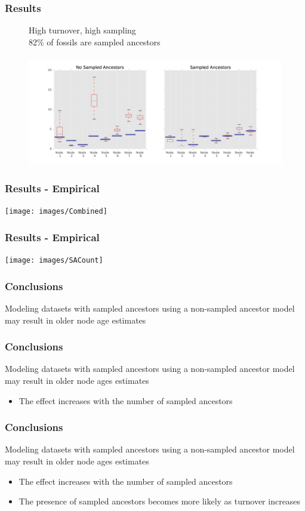 \documentclass[]{beamer}
\begin{document}
\begin{frame}
\frametitle{Results}
\begin{center}
\begin{figure}
High turnover, high sampling  \\
82\% of fossils are sampled ancestors \\
\mathlarger{\mathlarger{\mathlarger{\boldsymbol{\mu}}}} \lambda  \psi   \rho \\
\includegraphics[scale=0.4]{images/HighTurnHighSampnodes}
\end{figure}
\end{center}
\end{frame}


\begin{frame}
\frametitle{Results - Empirical}
\texttt{[image: images/Combined]}
\end{frame}

\begin{frame}
\frametitle{Results - Empirical}
\texttt{[image: images/SACount]}
\end{frame}


\begin{frame}
\frametitle{Conclusions}
Modeling datasets with sampled ancestors using a non-sampled ancestor model may result in older node age estimates
\end{frame}

\begin{frame}
\frametitle{Conclusions}
Modeling datasets with sampled ancestors using a non-sampled ancestor model may result in older node ages estimates
\begin{itemize}
\item The effect increases with the number of sampled ancestors
\end{itemize}
\end{frame}

\begin{frame}
\frametitle{Conclusions}
Modeling datasets with sampled ancestors using a non-sampled ancestor model may result in older node ages estimates
\begin{itemize}
\item The effect increases with the number of sampled ancestors
\item The presence of sampled ancestors becomes more likely as turnover increases
\end{itemize}
\end{frame}
\end{document}
